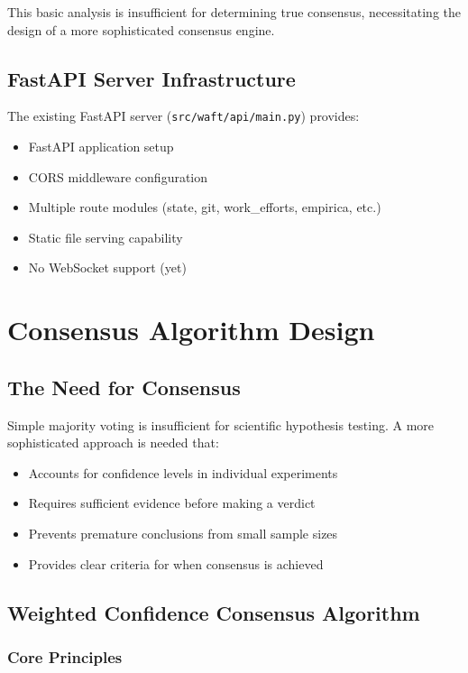 \documentclass{book}
\begin{document}
This basic analysis is insufficient for determining true consensus, necessitating the design of a more sophisticated consensus engine.

\section{FastAPI Server Infrastructure}

The existing FastAPI server (\texttt{src/waft/api/main.py}) provides:

\begin{itemize}
    \item FastAPI application setup
    \item CORS middleware configuration
    \item Multiple route modules (state, git, work\_efforts, empirica, etc.)
    \item Static file serving capability
    \item No WebSocket support (yet)
\end{itemize}

\chapter{Consensus Algorithm Design}

\section{The Need for Consensus}

Simple majority voting is insufficient for scientific hypothesis testing. A more sophisticated approach is needed that:

\begin{itemize}
    \item Accounts for confidence levels in individual experiments
    \item Requires sufficient evidence before making a verdict
    \item Prevents premature conclusions from small sample sizes
    \item Provides clear criteria for when consensus is achieved
\end{itemize}

\section{Weighted Confidence Consensus Algorithm}

\subsection{Core Principles}
\end{document}
